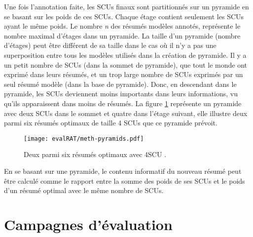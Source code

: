 \documentclass[a4paper,12pt,oneside]{../use/ESIthesis}
\begin{document}
Une fois l'annotation faite, les SCUs finaux sont partitionnés sur un pyramide en se basant sur les poids de ces SCUs. 
Chaque étage contient seulement les SCUs ayant le même poids. 
Le nombre \textit{n} des résumés modèles annotés, représente le nombre maximal d'étages dans un pyramide. 
La taille d'un pyramide (nombre d'étages) peut être différent de sa taille dans le cas où il n'y a pas une superposition entre tous les modèles utilisés dans la création de pyramide. 
Il y a un petit nombre de SCUs (dans la sommet de pyramide), que tout le monde ont exprimé dans leurs résumés, et un trop large nombre de SCUs exprimés par un seul résumé modèle (dans la base de pyramide). 
Donc, en descendant dans le pyramide, les SCUs deviennent moins importants dans leurs informations, vu qu'ils apparaissent dans moins de résumés. 
La figure \ref{fig:meth-pyramids} représente un pyramide avec deux SCUs dans le sommet et quatre dans l'étage suivant, elle illustre deux  parmi six résumés optimaux de taille 4 SCUs que ce pyramide prévoit. 
\begin{figure}[ht]
\begin{center}
\texttt{[image: evalRAT/meth-pyramids.pdf]} %
 \caption[Deux parmi six résumés optimaux avec 4SCU]{Deux parmi six résumés optimaux avec 4SCU \cite{07-nenkova-al}.}
 \label{fig:meth-pyramids}
\end{center}
\end{figure}

En se basant sur une pyramide, le contenu informatif du nouveau résumé peut être calculé comme le rapport entre la somme des poids de ses SCUs et le poids d'un résumé optimal avec le même nombre de SCUs. 

\section{Campagnes d'évaluation}
\end{document}

